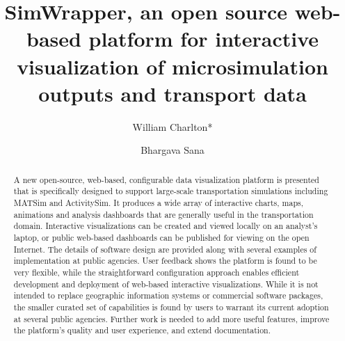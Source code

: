 \documentclass[3p,times,procedia]{elsarticle}
\begin{document}
\begin{frontmatter}



%

\title{SimWrapper, an open source web-based platform for interactive visualization of microsimulation outputs and transport data}

\author[a]{William Charlton*}
\author[b]{Bhargava Sana}

\address[a]{Technische Universität Berlin, Chair of Transport Systems Planning and Transport Telematics, Straße des 17. Juni 135, 10623 Berlin, Germany}
\address[b]{San Diego Association of Governments, 401 B Street, Unit 800, San Diego, CA 92101, United States}

\begin{abstract}
A new open-source, web-based, configurable data visualization platform is presented that is specifically designed to support large-scale transportation simulations including MATSim and ActivitySim. It produces a wide array of interactive charts, maps, animations and analysis dashboards that are generally useful in the transportation domain. Interactive visualizations can be created and viewed locally on an analyst's laptop, or public web-based dashboards can be published for viewing on the open Internet. The details of software design are provided along with several examples of implementation at public agencies. User feedback shows the platform is found to be very flexible, while the straightforward configuration approach enables efficient development and deployment of web-based interactive visualizations. While it is not intended to replace geographic information systems or commercial software packages, the smaller curated set of capabilities is found by users to warrant its current adoption at several public agencies. Further work is needed to add more useful features, improve the platform's quality and user experience, and extend documentation.


\end{abstract}
\end{frontmatter}
\end{document}
